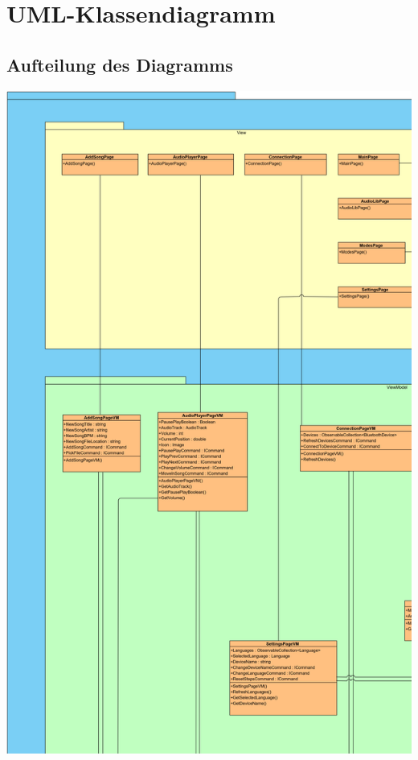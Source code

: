 \documentclass[../entwurf.tex]{subfiles}
\begin{document}
\section{UML-Klassendiagramm}

\subsection{Aufteilung des Diagramms}
\includegraphics[scale=0.12]{../graphics/uml_diagramme/Gesamt/1.png}
\end{document}
